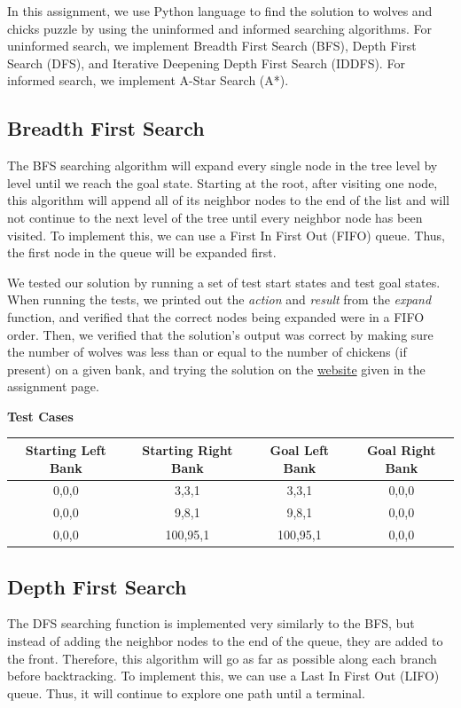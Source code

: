 \documentclass[onecolumn,draftclsnofoot, 10pt, compsoc]{IEEEtran}
\begin{document}
    In this assignment, we use Python language to find the solution to wolves and chicks puzzle by using the uninformed and informed searching algorithms. For uninformed search, we implement Breadth First Search (BFS), Depth First Search (DFS), and Iterative Deepening Depth First Search (IDDFS). For informed search, we implement A-Star Search (A*). 
    
	\subsection{Breadth First Search}
	The BFS searching algorithm will expand every single node in the tree level by level until we reach the goal state. Starting at the root, after visiting one node, this algorithm will append all of its neighbor nodes to the end of the list and will not continue to the next level of the tree until every neighbor node has been visited. To implement this, we can use a First In First Out (FIFO) queue. Thus, the first node in the queue will be expanded first.
	
	We tested our solution by running a set of test start states and test goal states.
	When running the tests, we printed out the \textit{action} and \textit{result} from the \textit{expand} function, and verified that the correct nodes being expanded were in a FIFO order. 
	Then, we verified that the solution's output was correct by making sure the number of wolves was less than or equal to the number of chickens (if present) on a given bank, and trying the solution on the \href{https://scratch.mit.edu/projects/55981236/}{website} given in the assignment page.
	
	\begin{center}
	\textbf{Test Cases}
	
	\begin{tabular}{|c|c|c|c|}
		\hline
		\textbf{Starting Left Bank} & \textbf{Starting Right Bank} & \textbf{Goal Left Bank} & \textbf{Goal Right Bank} \\ \hline
		
		0,0,0 & 3,3,1 & 3,3,1 & 0,0,0 \\ \hline	
		0,0,0 & 9,8,1 & 9,8,1 & 0,0,0 \\ \hline
		0,0,0 & 100,95,1 & 100,95,1 & 0,0,0 \\ \hline
\end{tabular}
\end{center}

	\subsection{Depth First Search}
	The DFS searching function is implemented very similarly to the BFS, but instead of adding the neighbor nodes to the end of the queue, they are added to the front. Therefore, this algorithm will go as far as possible along each branch before backtracking. To implement this, we can use a Last In First Out (LIFO) queue. Thus, it will continue to explore one path until a terminal.
	
\end{document}
